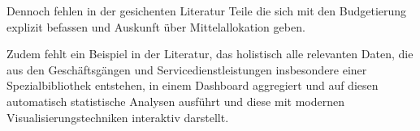 \documentclass[10pt,a4paper,twocolumn,conference]{IEEEtran}
\begin{document}
Dennoch fehlen in der gesichenten Literatur Teile die sich mit den Budgetierung
explizit befassen und Auskunft über Mittelallokation geben. 

Zudem fehlt ein Beispiel in der Literatur, das holistisch alle relevanten Daten, die aus den
Geschäftsgängen und Servicedienstleistungen insbesondere einer
Spezialbibliothek entstehen,
in einem Dashboard aggregiert und auf diesen automatisch 
statistische Analysen ausführt und diese mit modernen Visualisierungstechniken
interaktiv darstellt.

\begin{comment}
\section{Literaturdiskussion1}

Office-Lösungen zum Einsatz. Diese Applikationen sind entweder 
an bestimmte Bibliothekssysteme zurückgebunden, limitiert in ihren
Funktionen\cite{RN47} oder nicht mehr zeitgemaß.
Trotz dem Vorhandenseins von Open-Source-Software in dem Bereich von Business
Intelligence sind solche Lösungen in Bibliotheken scheinbar noch nicht so
häufig vertreten.
Vielmehr scheint mit dem Einvernehmen wie wichtig datengetriebene
Unterstützungssysteme sind, ein nur punktuelles Ausprobieren
der Möglichkeiten einherzugehen.\cite{RN31} 


programmierten Tools zu beantworten. So werden Fragen nach Weeding versucht zu
beantworten, oder nach de:update
m Erfolg von Lerngruppen in der Bibliothek...
Shiny, R -> sollen leicht erweiterbar sein
Versuche einzelner Fragestellungen werden verknüoft mit grafischen
Darstellungen -> Weeding, ... Erfolg Lerngruppen in Bibliotheken
Fachref aber nur für einen Anbieter geschriebenn
meistens für große Bibliotheken und bisher für keine wissenschaftliche
Spezialbibliothek -> personelle Ressourcen knapp -> Erleichterung bei der
Erfassung von Daten da automatisiert


\end{comment}
\end{document}
